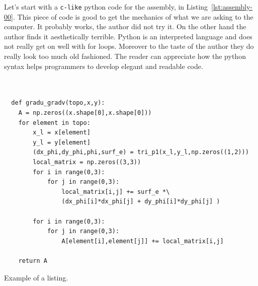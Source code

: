 \documentclass[11pt]{amsart}
\begin{document}
Let's start with a \texttt{c-like} python code for the assembly, in 
Listing~\ref{lst:assembly-00}. This piece of code is good to get 
the mechanics of what we are asking to the computer. It probably 
works, the author did not try it. On the other hand the author finds it 
aesthetically terrible. Python is an interpreted language and does not 
really get on well with for loops. Moreover to the taste of the author they 
do really look too much old fashioned. The reader can appreciate how 
the python syntax helps programmers to develop elegant and readable code.



\begin{listing}[H]
\begin{verbatim}
               

  def gradu_gradv(topo,x,y):
    A = np.zeros((x.shape[0],x.shape[0]))
    for element in topo:
        x_l = x[element]
        y_l = y[element]
        (dx_phi,dy_phi,phi,surf_e) = tri_p1(x_l,y_l,np.zeros((1,2)))
        local_matrix = np.zeros((3,3))
        for i in range(0,3):
            for j in range(0,3):
                local_matrix[i,j] += surf_e *\ 
                (dx_phi[i]*dx_phi[j] + dy_phi[i]*dy_phi[j] )
            
        for i in range(0,3):
            for j in range(0,3):
                A[element[i],element[j]] += local_matrix[i,j]

    return A
\end{verbatim}
\caption{Example of a listing.}
\label{lst:assembly-00}
\end{listing}
\end{document}

